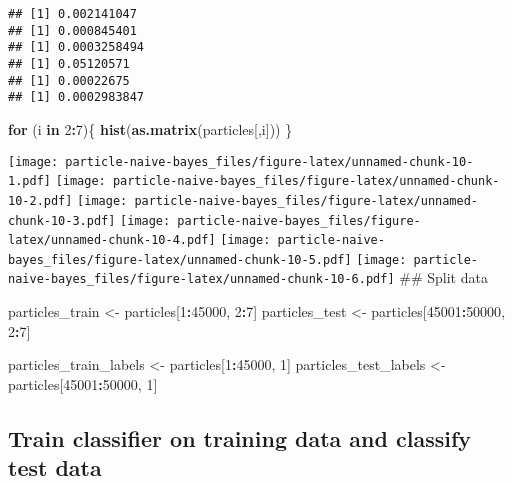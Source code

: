 \documentclass[
]{article}
\newenvironment{Shaded}{\begin{snugshade}}{\end{snugshade}}
\newcommand{\ControlFlowTok}[1]{\textcolor[rgb]{0.13,0.29,0.53}{\textbf{#1}}}
\newcommand{\DecValTok}[1]{\textcolor[rgb]{0.00,0.00,0.81}{#1}}
\newcommand{\KeywordTok}[1]{\textcolor[rgb]{0.13,0.29,0.53}{\textbf{#1}}}
\newcommand{\NormalTok}[1]{#1}
\newcommand{\OperatorTok}[1]{\textcolor[rgb]{0.81,0.36,0.00}{\textbf{#1}}}
\newcommand{\StringTok}[1]{\textcolor[rgb]{0.31,0.60,0.02}{#1}}
\begin{document}
\begin{verbatim}
## [1] 0.002141047
## [1] 0.000845401
## [1] 0.0003258494
## [1] 0.05120571
## [1] 0.00022675
## [1] 0.0002983847
\end{verbatim}

\begin{Shaded}
\begin{Highlighting}[]
\ControlFlowTok{for}\NormalTok{ (i }\ControlFlowTok{in} \DecValTok{2}\OperatorTok{:}\DecValTok{7}\NormalTok{)\{}
  \KeywordTok{hist}\NormalTok{(}\KeywordTok{as.matrix}\NormalTok{(particles[,i]))}
\NormalTok{\}}
\end{Highlighting}
\end{Shaded}

\texttt{[image: particle-naive-bayes\_files/figure-latex/unnamed-chunk-10-1.pdf]}
\texttt{[image: particle-naive-bayes\_files/figure-latex/unnamed-chunk-10-2.pdf]}
\texttt{[image: particle-naive-bayes\_files/figure-latex/unnamed-chunk-10-3.pdf]}
\texttt{[image: particle-naive-bayes\_files/figure-latex/unnamed-chunk-10-4.pdf]}
\texttt{[image: particle-naive-bayes\_files/figure-latex/unnamed-chunk-10-5.pdf]}
\texttt{[image: particle-naive-bayes\_files/figure-latex/unnamed-chunk-10-6.pdf]}
\#\# Split data

\begin{Shaded}
\begin{Highlighting}[]
\NormalTok{particles_train <-}\StringTok{ }\NormalTok{particles[}\DecValTok{1}\OperatorTok{:}\DecValTok{45000}\NormalTok{, }\DecValTok{2}\OperatorTok{:}\DecValTok{7}\NormalTok{]}
\NormalTok{particles_test <-}\StringTok{ }\NormalTok{particles[}\DecValTok{45001}\OperatorTok{:}\DecValTok{50000}\NormalTok{, }\DecValTok{2}\OperatorTok{:}\DecValTok{7}\NormalTok{]}

\NormalTok{particles_train_labels <-}\StringTok{ }\NormalTok{particles[}\DecValTok{1}\OperatorTok{:}\DecValTok{45000}\NormalTok{, }\DecValTok{1}\NormalTok{]}
\NormalTok{particles_test_labels <-}\StringTok{ }\NormalTok{particles[}\DecValTok{45001}\OperatorTok{:}\DecValTok{50000}\NormalTok{, }\DecValTok{1}\NormalTok{]}
\end{Highlighting}
\end{Shaded}

\hypertarget{train-classifier-on-training-data-and-classify-test-data-1}{%
\subsection{Train classifier on training data and classify test
data}\label{train-classifier-on-training-data-and-classify-test-data-1}}
\end{document}
